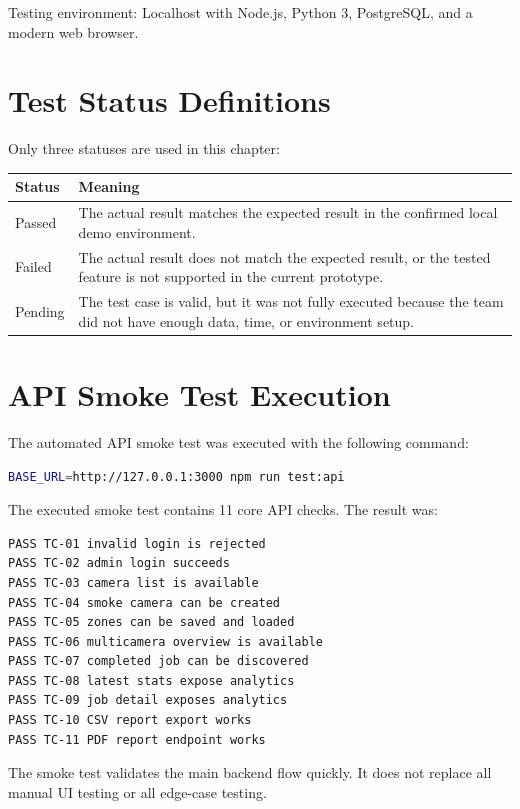 \documentclass[12pt,a4paper]{report}
\begin{document}
Testing environment: Localhost with Node.js, Python 3, PostgreSQL, and a modern web browser.

\section{Test Status Definitions}

Only three statuses are used in this chapter:

\begin{longtable}{|p{3.4cm}|p{10.2cm}|}
\hline
\rowcolor{HeaderBlue}
\textbf{Status} & \textbf{Meaning} \\
\hline
Passed & The actual result matches the expected result in the confirmed local demo environment. \\
\hline
Failed & The actual result does not match the expected result, or the tested feature is not supported in the current prototype. \\
\hline
Pending & The test case is valid, but it was not fully executed because the team did not have enough data, time, or environment setup. \\
\hline
\end{longtable}

\section{API Smoke Test Execution}

The automated API smoke test was executed with the following command:

\begin{lstlisting}[language=bash]
BASE_URL=http://127.0.0.1:3000 npm run test:api
\end{lstlisting}

The executed smoke test contains 11 core API checks. The result was:

\begin{lstlisting}
PASS TC-01 invalid login is rejected
PASS TC-02 admin login succeeds
PASS TC-03 camera list is available
PASS TC-04 smoke camera can be created
PASS TC-05 zones can be saved and loaded
PASS TC-06 multicamera overview is available
PASS TC-07 completed job can be discovered
PASS TC-08 latest stats expose analytics
PASS TC-09 job detail exposes analytics
PASS TC-10 CSV report export works
PASS TC-11 PDF report endpoint works
\end{lstlisting}

The smoke test validates the main backend flow quickly. It does not replace all manual UI testing or all edge-case testing.
\end{document}
